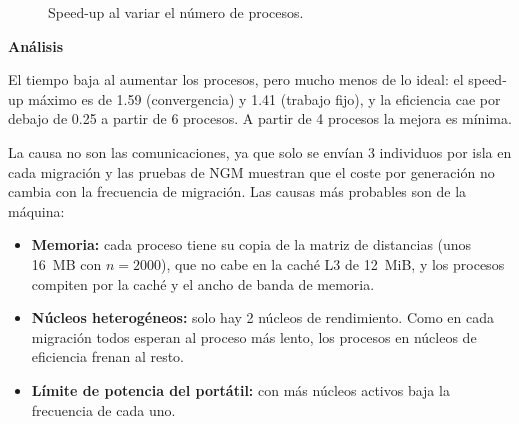 \documentclass[12pt]{article}
\begin{document}
\begin{enumerate}
\begin{figure}[htbp]
\centering
{}
\caption{Speed-up al variar el número de procesos.}
\label{fig:c2_speedup}
\end{figure}

\vspace{0.5cm}

\medskip
\noindent\textbf{Análisis}\par
\smallskip

El tiempo baja al aumentar los procesos, pero mucho menos de lo ideal: el speed-up máximo es de 1.59 (convergencia) y 1.41 (trabajo fijo), y la eficiencia cae por debajo de 0.25 a partir de 6 procesos. A partir de 4 procesos la mejora es mínima.

La causa no son las comunicaciones, ya que solo se envían 3 individuos por isla en cada migración y las pruebas de NGM muestran que el coste por generación no cambia con la frecuencia de migración. Las causas más probables son de la máquina:

\begin{itemize}
    \item \textbf{Memoria:} cada proceso tiene su copia de la matriz de distancias (unos 16~MB con $n=2000$), que no cabe en la caché L3 de 12~MiB, y los procesos compiten por la caché y el ancho de banda de memoria.
    \item \textbf{Núcleos heterogéneos:} solo hay 2 núcleos de rendimiento. Como en cada migración todos esperan al proceso más lento, los procesos en núcleos de eficiencia frenan al resto.
    \item \textbf{Límite de potencia del portátil:} con más núcleos activos baja la frecuencia de cada uno.
\end{itemize}


\end{enumerate}
\end{document}
